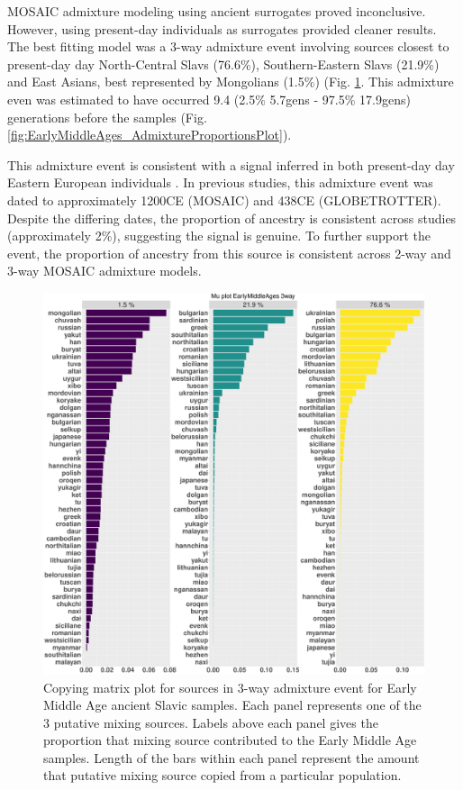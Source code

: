 MOSAIC admixture modeling using ancient surrogates proved inconclusive. However, using present-day individuals as surrogates provided cleaner results. The best fitting model was a 3-way admixture event involving sources closest to present-day day North-Central Slavs (76.6\%), Southern-Eastern Slavs (21.9\%) and East Asians, best represented by Mongolians (1.5\%) (Fig. \ref{fig:EarlyMiddleAges_MOSAIC_3way_moderns_Mu}. This admixture even was estimated to have occurred 9.4 (2.5\% 5.7gens - 97.5\% 17.9gens) generations before the samples (Fig. \ref{fig:EarlyMiddleAges_AdmixtureProportionsPlot}). 

This admixture event is consistent with a signal inferred in both present-day day Eastern European individuals \cite{MOSAIC_2019, Hellenthal2014}. In previous studies, this admixture event was dated to approximately 1200CE (MOSAIC) and 438CE (GLOBETROTTER). Despite the differing dates, the proportion of ancestry is consistent across studies (approximately 2\%), suggesting the signal is genuine. To further support the event, the proportion of ancestry from this source is consistent across 2-way and 3-way MOSAIC admixture models. 

\begin{figure}[htp]
    \centering
    \includegraphics[width=1.0\textwidth]{../images/chapter5/Mu_plot_EarlyMiddleAges_3way.pdf}
    \caption{Copying matrix plot for sources in 3-way admixture event for Early Middle Age ancient Slavic samples. Each panel represents one of the 3 putative mixing sources. Labels above each panel gives the proportion that mixing source contributed to the Early Middle Age samples. Length of the bars within each panel represent the amount that putative mixing source copied from a particular population.}
    \label{fig:EarlyMiddleAges_MOSAIC_3way_moderns_Mu}
\end{figure}

